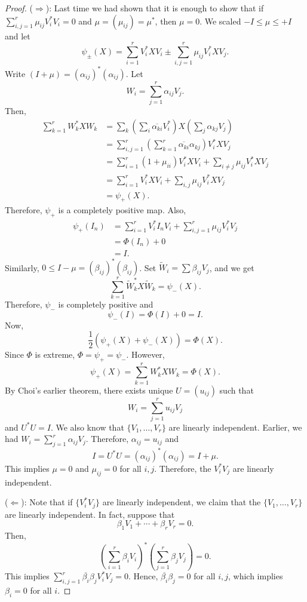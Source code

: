 \documentclass[12pt]{article}
\theoremstyle{definition}
\begin{document}
\begin{proof}
($\Rightarrow$): Last time we had shown that it is enough to show that if $\sum_{i,j=1}^r \mu_{ij}V_i^*V_i = 0$ and $\mu=(\mu_{ij})=\mu^*$, then $\mu=0$. We scaled $-I \leq \mu \leq +I$ and let
\[
\psi_\pm(X) = \sum_{i=1}^r V_i^*XV_i \pm \sum_{i,j=1}^r \mu_{ij}V_i^*XV_j.
\]
Write $(I+\mu)=(\alpha_{ij})^*(\alpha_{ij})$. Let
\[
W_i = \sum_{j=1}^r \alpha_{ij}V_j.
\]
Then,
\begin{align*}
\sum_{k=1}^r W_k^*XW_k &= \sum_k \left(\sum_i \overline{\alpha_{ki}}V_i^*\right)X\left(\sum_j \alpha_{kj}V_j\right) \\
&= \sum_{i,j=1}^r \left(\sum_{k=1}^r \overline{\alpha_{ki}}\alpha_{kj}\right)V_i^*XV_j \\
&= \sum_{i=1}^r (1+\mu_{ii})V_i^*XV_i + \sum_{i \neq j} \mu_{ij}V_i^*XV_j \\
&= \sum_{i=1}^r V_i^*XV_i + \sum_{i,j} \mu_{ij}V_i^*XV_j \\
&= \psi_+(X).
\end{align*}
Therefore, $\psi_+$ is a completely positive map. Also,
\begin{align*}
\psi_+(I_n) &= \sum_{i=1}^r V_i^*I_nV_i + \sum_{i,j=1}^r \mu_{ij}V_i^*V_j \\
&= \Phi(I_n) + 0 \\
&= I.
\end{align*}
Similarly, $0 \leq I-\mu = (\beta_{ij})^*(\beta_{ij})$. Set $\widetilde{W}_i = \sum \beta_{ij}V_j$, and we get
\[
\sum_{k=1}^r \widetilde{W}_k^*X\widetilde{W}_k = \psi_-(X).
\]
Therefore, $\psi_-$ is completely positive and
\[
\psi_-(I)=\Phi(I)+0=I.
\]
Now,
\[
\frac{1}{2}(\psi_+(X)+\psi_-(X)) = \Phi(X).
\]
Since $\Phi$ is extreme, $\Phi=\psi_+=\psi_-$. However,
\[
\psi_+(X) = \sum_{k=1}^r W_k^*XW_k = \Phi(X).
\]
By Choi's earlier theorem, there exists unique $U=(u_{ij})$ such that
\[
W_i = \sum_{j=1}^r u_{ij}V_j
\]
and $U^*U=I$. We also know that $\{V_1,\ldots,V_r\}$ are linearly independent. Earlier, we had $W_i = \sum_{j=1}^r \alpha_{ij}V_j$. Therefore, $\alpha_{ij}=u_{ij}$ and
\[
I = U^*U = (\alpha_{ij})^*(\alpha_{ij}) = I+\mu.
\]
This implies $\mu=0$ and $\mu_{ij}=0$ for all $i,j$. Therefore, the $V_i^*V_j$ are linearly independent.

($\Leftarrow$): Note that if $\{V_i^*V_j\}$ are linearly independent, we claim that the $\{V_1,\ldots,V_r\}$ are linearly independent. In fact, suppose that
\[
\beta_1V_1 + \cdots + \beta_rV_r = 0.
\]
Then,
\[
\left(\sum_{i=1}^r \beta_iV_i\right)^*\left(\sum_{j=1}^r \beta_jV_j\right)=0.
\]
This implies $\sum_{i,j=1}^r \overline{\beta_i}\beta_jV_i^*V_j = 0$. Hence, $\overline{\beta_i}\beta_j=0$ for all $i,j$, which implies $\beta_i=0$ for all $i$.


\end{proof}
\end{document}
